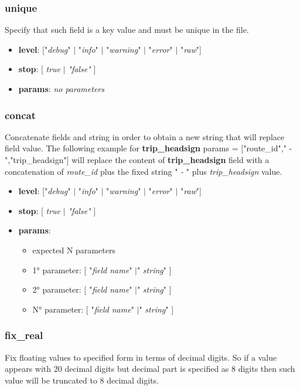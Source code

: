 \documentclass[12pt, a4paper]{book}
\begin{document}
\subsubsection{unique}
\begin{justify}
Specify that such field is a key value and must be unique in the file.
\end{justify}

\begin{itemize}
\item \textbf{level}: ["\textit{debug}" $|$ "\textit{info}" $|$ "\textit{warning}" $|$ "\textit{error}" $|$ "\textit{raw}"]
\item \textbf{stop}: [ \textit{true} $|$ \textit{"false"} ]
\item \textbf{params}: \textit{no parameters}
\end{itemize}


\subsubsection{concat}
\begin{justify}
Concatenate fields and string in order to obtain a new string that will replace field value. The following example for \textbf{trip\_headsign} params = ["route\_id"," - ","trip\_headsign"] will replace the content of \textbf{trip\_headsign} field with a concatenation of \textit{route\_id} plus the fixed string "\textit{ - }" plus \textit{trip\_headsign} value.
\end{justify}

\begin{itemize}
\item \textbf{level}: ["\textit{debug}" $|$ "\textit{info}" $|$ "\textit{warning}" $|$ "\textit{error}" $|$ "\textit{raw}"]
\item \textbf{stop}: [ \textit{true} $|$ \textit{"false"} ]
\item \textbf{params}: 
  \begin{itemize}
  \item expected N parameters
  \item 1° parameter: [ "\textit{field name}" $|$" \textit{string}" ]
  \item 2° parameter: [ "\textit{field name}" $|$" \textit{string}" ]
  \item N° parameter: [ "\textit{field name}" $|$" \textit{string}" ]
  \end{itemize}
\end{itemize}


\subsubsection{fix\_real}
\begin{justify}
Fix floating values to specified form in terms of decimal digits. So if a value appears with 20 decimal digits but decimal part is specified as 8 digits then such value will be truncated to 8 decimal digits.
\end{justify}
\end{document}
